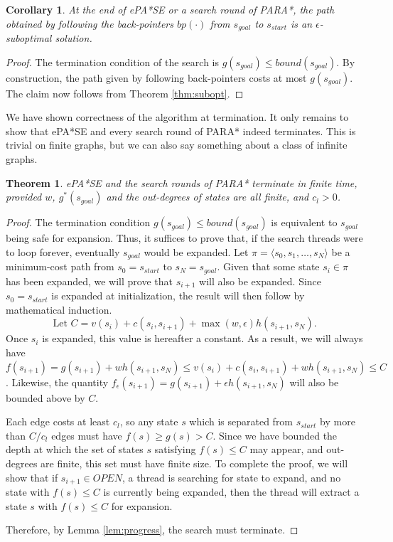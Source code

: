 \documentclass[letterpaper]{article}
\newtheorem{thm}{Theorem}
\newtheorem{cor}{Corollary}
\begin{document}
\begin{cor}
\label{cor:subopt}
At the end of ePA*SE or a search round of PARA*, the path obtained by following the back-pointers $bp(\cdot)$ from $s_{goal}$ to $s_{start}$ is an $\epsilon$-suboptimal solution.
\end{cor}

\begin{proof}
The termination condition of the search is $g(s_{goal}) \le bound(s_{goal})$. By construction, the path given by following back-pointers costs at most $g(s_{goal})$. The claim now follows from Theorem \ref{thm:subopt}.
\end{proof}

We have shown correctness of the algorithm at termination. It only remains to show that ePA*SE and every search round of PARA* indeed terminates. This is trivial on finite graphs, but we can also say something about a class of infinite graphs.

\begin{thm}
\label{thm:complete}
ePA*SE and the search rounds of PARA* terminate in finite time, provided $w$, $g^*(s_{goal})$ and the out-degrees of states are all finite, and $c_l > 0$.
\end{thm}

\begin{proof}
The termination condition $g(s_{goal}) \le bound(s_{goal})$ is equivalent to $s_{goal}$ being safe for expansion. Thus, it suffices to prove that, if the search threads were to loop forever, eventually $s_{goal}$ would be expanded. Let $\pi = \langle s_0,s_1,\ldots,s_N \rangle$ be a minimum-cost path from $s_0 = s_{start}$ to $s_N = s_{goal}$. Given that some state $s_i\in\pi$ has been expanded, we will prove that $s_{i+1}$ will also be expanded. Since $s_0 = s_{start}$ is expanded at initialization, the result will then follow by mathematical induction.
\[\text{Let }C = v(s_i) + c(s_i, s_{i+1}) + \max(w,\epsilon)h(s_{i+1}, s_N).\]
Once $s_i$ is expanded, this value is hereafter a constant. As a result, we will always have $f(s_{i+1}) = g(s_{i+1}) + wh(s_{i+1}, s_N) \le v(s_i) + c(s_i, s_{i+1}) + wh(s_{i+1}, s_N) \le C$. Likewise, the quantity $f_\epsilon(s_{i+1}) = g(s_{i+1}) + \epsilon h(s_{i+1}, s_N)$ will also be bounded above by $C$.

Each edge costs at least $c_l$, so any state $s$ which is separated from $s_{start}$ by more than $C/c_l$ edges must have $f(s) \ge g(s) > C$. Since we have bounded the depth at which the set of states $s$ satisfying $f(s) \le C$ may appear, and out-degrees are finite, this set must have finite size. To complete the proof, we will show that if $s_{i+1}\in OPEN$, a thread is searching for state to expand, and no state with $f(s) \le C$ is currently being expanded, then the thread will extract a state $s$ with $f(s) \le C$ for expansion.

Therefore, by Lemma \ref{lem:progress}, the search must terminate.
\end{proof}
\end{document}
